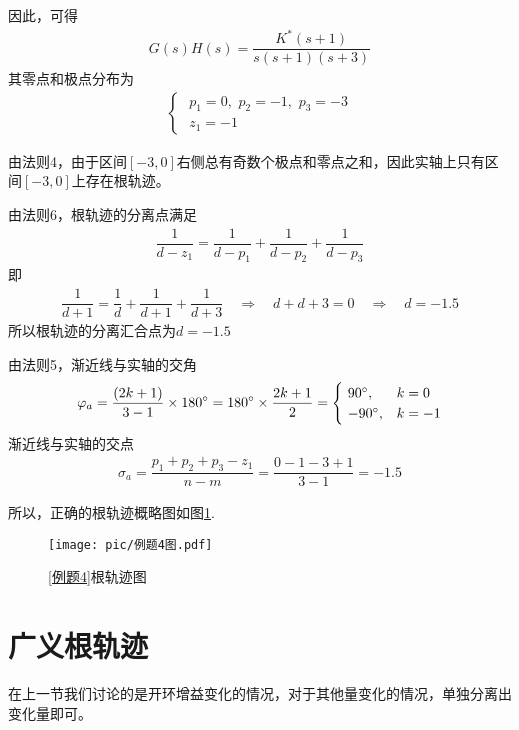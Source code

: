 因此，可得
\begin{align*}
	G(s)H(s) = \dfrac{K^*(s + 1)}{s(s+1)(s+3)}
\end{align*}
其零点和极点分布为
\begin{align*}
	\begin{cases}
		\,\, p_1 = 0, \,\, p_2 = -1, \,\, p_3 = -3\\
		\,\, z_1 = -1
	\end{cases}
\end{align*}

由法则4，由于区间$[-3,0]$右侧总有奇数个极点和零点之和，因此实轴上只有区间$[-3,0]$上存在根轨迹。

由法则6，根轨迹的分离点满足
\begin{align*}
	\dfrac{1}{d - z_1} = \dfrac{1}{d - p_1} + \dfrac{1}{d - p_2} + \dfrac{1}{d - p_3}
\end{align*}
即
\begin{align*}
	\dfrac{1}{d +1} = \dfrac{1}{d} + \dfrac{1}{d + 1} + \dfrac{1}{d + 3} \quad \Rightarrow \quad 
	d + d + 3 = 0 \quad \Rightarrow \quad d = -1.5
\end{align*}
所以根轨迹的分离汇合点为$d = -1.5$

由法则5，渐近线与实轴的交角
\begin{align*}
	\varphi_a = \dfrac{(2k + 1)}{3 - 1} \times 180{}^{\circ} =180{}^{\circ}\times \dfrac{2k + 1}{2} = 
	\begin{cases}
		\,\, 90{}^{\circ}, &k = 0\\
		\,\, -90 {}^{\circ}, & k = -1
	\end{cases} 
\end{align*}
渐近线与实轴的交点
\begin{align*}
	\sigma_a = \dfrac{p_1 + p_2 + p_3 - z_1}{n - m} = \dfrac{0 -1 - 3 +1}{3 - 1} = -1.5
\end{align*}

所以，正确的根轨迹概略图如图\ref{例题4根轨迹图}.
\begin{figure}[!htb]
	\centering
	\texttt{[image: pic/例题4图.pdf]}
	\caption{\ref{例题4}根轨迹图}
	\label{例题4根轨迹图}
\end{figure}




\section{广义根轨迹}
在上一节我们讨论的是开环增益变化的情况，对于其他量变化的情况，单独分离出变化量即可。
\vspace*{0.5em}

